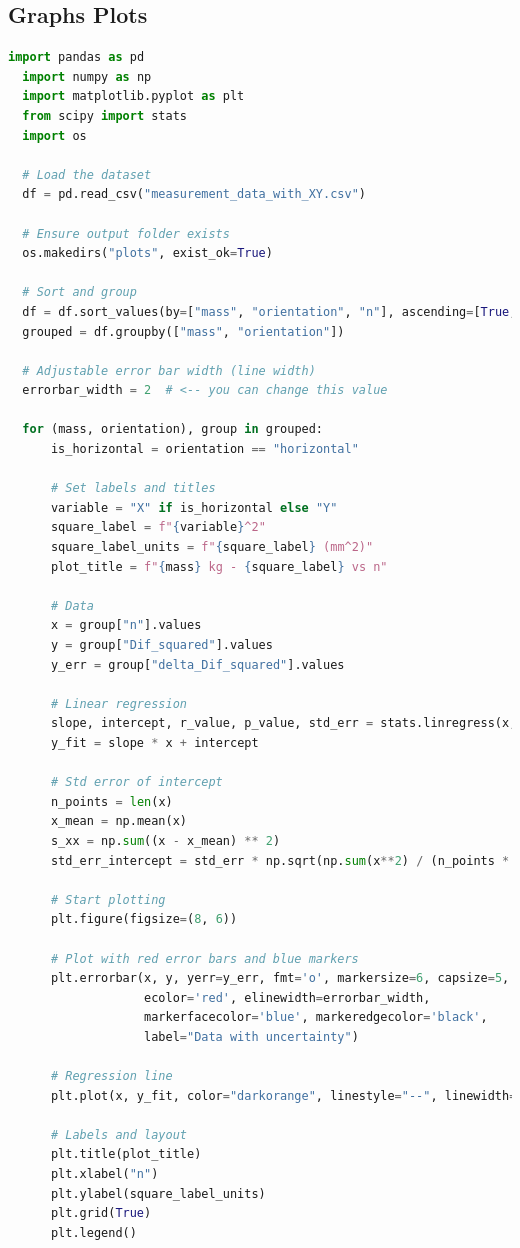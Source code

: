 \documentclass[a4paper,11pt]{article}
\begin{document}
\subsection{Graphs Plots}
\begin{lstlisting}[language=Python]
  import pandas as pd
  import numpy as np
  import matplotlib.pyplot as plt
  from scipy import stats
  import os
  
  # Load the dataset
  df = pd.read_csv("measurement_data_with_XY.csv")
  
  # Ensure output folder exists
  os.makedirs("plots", exist_ok=True)
  
  # Sort and group
  df = df.sort_values(by=["mass", "orientation", "n"], ascending=[True, True, True])
  grouped = df.groupby(["mass", "orientation"])
  
  # Adjustable error bar width (line width)
  errorbar_width = 2  # <-- you can change this value
  
  for (mass, orientation), group in grouped:
      is_horizontal = orientation == "horizontal"
      
      # Set labels and titles
      variable = "X" if is_horizontal else "Y"
      square_label = f"{variable}^2"
      square_label_units = f"{square_label} (mm^2)"
      plot_title = f"{mass} kg - {square_label} vs n"
  
      # Data
      x = group["n"].values
      y = group["Dif_squared"].values
      y_err = group["delta_Dif_squared"].values
  
      # Linear regression
      slope, intercept, r_value, p_value, std_err = stats.linregress(x, y)
      y_fit = slope * x + intercept
  
      # Std error of intercept
      n_points = len(x)
      x_mean = np.mean(x)
      s_xx = np.sum((x - x_mean) ** 2)
      std_err_intercept = std_err * np.sqrt(np.sum(x**2) / (n_points * s_xx))
  
      # Start plotting
      plt.figure(figsize=(8, 6))
  
      # Plot with red error bars and blue markers
      plt.errorbar(x, y, yerr=y_err, fmt='o', markersize=6, capsize=5,
                   ecolor='red', elinewidth=errorbar_width,
                   markerfacecolor='blue', markeredgecolor='black',
                   label="Data with uncertainty")
  
      # Regression line
      plt.plot(x, y_fit, color="darkorange", linestyle="--", linewidth=2, label="Linear Fit")
  
      # Labels and layout
      plt.title(plot_title)
      plt.xlabel("n")
      plt.ylabel(square_label_units)
      plt.grid(True)
      plt.legend()
  

\end{lstlisting}
\end{document}

